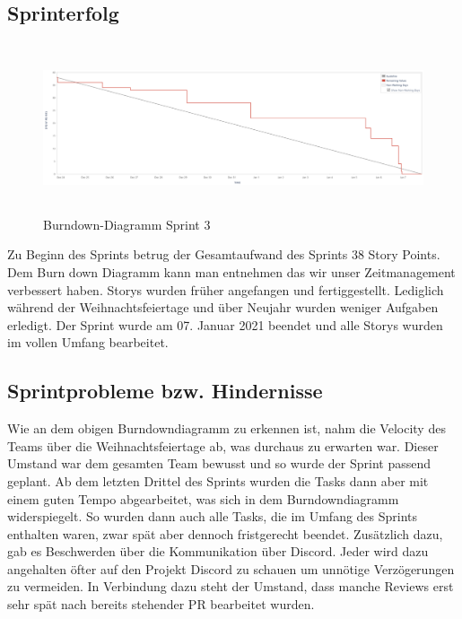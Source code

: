 \documentclass[12pt,a4paper, oneside]{article}
\begin{document}
    \subsection{Sprinterfolg}
    \begin{figure}[h]
        \centering
        \includegraphics[width=\textwidth, height=5cm]{../img/sprint_03/Burndown-Sprint3.PNG}
        \caption{Burndown-Diagramm Sprint 3}
        \label{fig: Burndown-Sprint3}
    \end{figure}

    \noindent
    Zu Beginn des Sprints betrug der Gesamtaufwand des Sprints 38 Story Points.
    Dem Burn down Diagramm kann man entnehmen das wir unser Zeitmanagement verbessert haben.
    Storys wurden früher angefangen und fertiggestellt.
    Lediglich während der Weihnachtsfeiertage und über Neujahr wurden weniger Aufgaben erledigt.
    Der Sprint wurde am 07. Januar 2021 beendet und alle Storys wurden im vollen Umfang bearbeitet.



    \subsection{Sprintprobleme bzw. Hindernisse}

    Wie an dem obigen Burndowndiagramm zu erkennen ist, nahm die Velocity des Teams über die Weihnachtsfeiertage ab, was durchaus zu erwarten war. Dieser Umstand war dem gesamten Team bewusst und so wurde der Sprint passend geplant. Ab dem letzten Drittel des Sprints wurden die Tasks dann aber mit einem guten Tempo abgearbeitet, was sich in dem Burndowndiagramm widerspiegelt. So wurden dann auch alle Tasks, die im Umfang des Sprints enthalten waren, zwar spät aber dennoch fristgerecht beendet. Zusätzlich dazu, gab es Beschwerden über die Kommunikation über Discord. Jeder wird dazu angehalten öfter auf den Projekt Discord zu schauen um unnötige Verzögerungen zu vermeiden. In Verbindung dazu steht der Umstand, dass manche Reviews erst sehr spät nach bereits stehender PR bearbeitet wurden.
\end{document}
